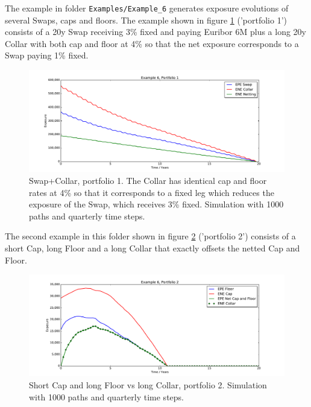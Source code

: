 \documentclass[12pt, a4paper]{article}
\begin{document}
{The example in folder {\tt Examples/Example\_6} generates exposure evolutions of several Swaps, caps and floors. The
example shown in figure \ref{fig_capfloor_1} ('portfolio 1') consists of a 20y Swap receiving 3\% fixed and paying
Euribor 6M plus a long 20y Collar
with both cap and floor at 4\% so that the net exposure corresponds to a Swap paying 1\% fixed. \\

\begin{figure}[h!]
\begin{center}
\includegraphics[scale=0.45]{mpl_capfloor_1.pdf}
\end{center}
\caption{Swap+Collar, portfolio 1. The Collar has identical cap and floor rates at 4\% so that it corresponds to a
  fixed leg which reduces the exposure of the Swap, which receives 3\% fixed. Simulation with 1000 paths and quarterly
  time steps.}
\label{fig_capfloor_1}
\end{figure}

The second example in this folder shown in figure \ref{fig_capfloor_2} ('portfolio 2') consists of a short Cap, long
Floor and a long Collar that exactly offsets the netted Cap and Floor.

\begin{figure}[h!]
\begin{center}
\includegraphics[scale=0.45]{mpl_capfloor_2.pdf}
\end{center}
\caption{Short Cap and long Floor vs long Collar, portfolio 2. Simulation with 1000 paths and quarterly time steps.}
\label{fig_capfloor_2}
\end{figure}

}
\end{document}

